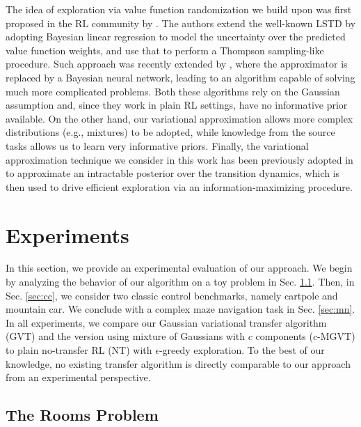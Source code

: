 \documentclass{article}
\begin{document}

The idea of exploration via value function randomization we build upon was first proposed in the RL community by \cite{}. The authors extend the well-known LSTD \cite{} by adopting Bayesian linear regression to model the uncertainty over the predicted value function weights, and use that to perform a Thompson sampling-like procedure. Such approach was recently extended by \cite{}, where the approximator is replaced by a Bayesian neural network, leading to an algorithm capable of solving much more complicated problems. Both these algorithms rely on the Gaussian assumption and, since they work in plain RL settings, have no informative prior available. On the other hand, our variational approximation allows more complex distributions (e.g., mixtures) to be adopted, while knowledge from the source tasks allows us to learn very informative priors. Finally, the variational approximation technique we consider in this work has been previously adopted in \cite{} to approximate an intractable posterior over the transition dynamics, which is then used to drive efficient exploration via an information-maximizing procedure.

\section{Experiments}

In this section, we provide an experimental evaluation of our approach. We begin by analyzing the behavior of our algorithm on a toy problem in Sec. \ref{sec:gw}. Then, in Sec. \ref{sec:cc}, we consider two classic control benchmarks, namely cartpole and mountain car. We conclude with a complex maze navigation task in Sec. \ref{sec:mn}. In all experiments, we compare our Gaussian variational transfer algorithm (GVT) and the version using mixture of Gaussians with $c$ components ($c$-MGVT) to plain no-transfer RL (NT) with $\epsilon$-greedy exploration. To the best of our knowledge, no existing transfer algorithm is directly comparable to our approach from an experimental perspective.  

\subsection{The Rooms Problem} \label{sec:gw}
\end{document}
